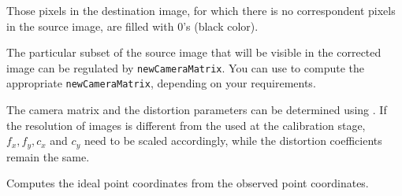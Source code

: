Those pixels in the destination image, for which there is no correspondent pixels in the source image, are filled with 0's (black color).

The particular subset of the source image that will be visible in the corrected image can be regulated by \texttt{newCameraMatrix}. You can use  to compute the appropriate \texttt{newCameraMatrix}, depending on your requirements.

The camera matrix and the distortion parameters can be determined using
. If the resolution of images is different from the used at the calibration stage, $f_x, f_y, c_x$ and $c_y$ need to be scaled accordingly, while the distortion coefficients remain the same.


Computes the ideal point coordinates from the observed point coordinates.



